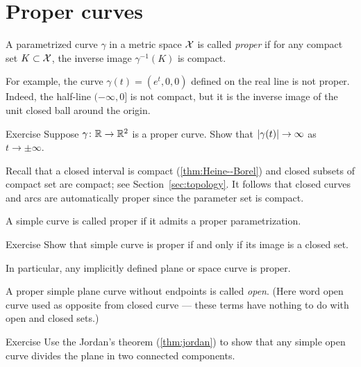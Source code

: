 \section{Proper curves}\label{sec:proper-curves}

A parametrized curve $\gamma$ in a metric space $\mathcal{X}$ is called \emph{proper} if for any compact set $K \subset \mathcal{X}$, the inverse image $\gamma^{-1}(K)$ is compact.

For example, the curve $\gamma(t)=(e^t,0,0)$ defined on the real line is not proper.
Indeed, the half-line $(-\infty,0]$ is not compact, but it is the inverse image of the unit closed ball around the origin.

\begin{thm}{Exercise}\label{ex:open-curve}
Suppose $\gamma\colon\mathbb{R}\to\mathbb{R}^2$ is a proper curve.
Show that $|\gamma(t)|\z\to\infty$ as $t\to\pm\infty$.
\end{thm}


Recall that a closed interval is compact (\ref{thm:Heine--Borel}) and closed subsets of compact set are compact;
see Section~\ref{sec:topology}.
It follows that closed curves and arcs are automatically proper since the parameter set is compact.

A simple curve is called proper if it admits a proper parametrization.

\begin{thm}{Exercise}\label{ex:proper-closed}
Show that simple curve is proper if and only if its image is a closed set.

In particular, any implicitly defined plane or space curve is proper.
\end{thm}

A proper simple plane curve without endpoints is called \emph{open}.
(Here word open curve used as opposite from closed curve --- these terms have nothing to do with open and closed sets.)

\begin{thm}{Exercise}\label{ex:proper-curve}
Use the Jordan's theorem (\ref{thm:jordan}) to show that any simple open curve divides the plane in two connected components.  
\end{thm}



